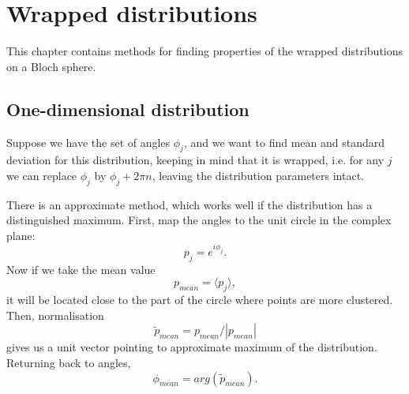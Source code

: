 \chapter{Wrapped distributions}
\label{cha:appendix:distributions}


This chapter contains methods for finding properties of the wrapped distributions on a Bloch sphere.


\section{One-dimensional distribution}

Suppose we have the set of angles $\phi_j$, and we want to find mean and standard deviation for this distribution,
keeping in mind that it is wrapped,
i.e. for any $j$ we can replace $\phi_j$ by $\phi_j + 2\pi n$, leaving the distribution parameters intact.

There is an approximate method, which works well if the distribution has a distinguished maximum.
First, map the angles to the unit circle in the complex plane:
\[
	p_j = e^{i\phi_j}.
\]
Now if we take the mean value
\[
	p_{mean} = \langle p_j \rangle,
\]
it will be located close to the part of the circle where points are more clustered.
Then, normalisation
\[
	\tilde{p}_{mean} = p_{mean} / | p_{mean} |
\]
gives us a unit vector pointing to approximate maximum of the distribution.
Returning back to angles,
\[
	\phi_{mean} = arg(\tilde{p}_{mean}).
\]
